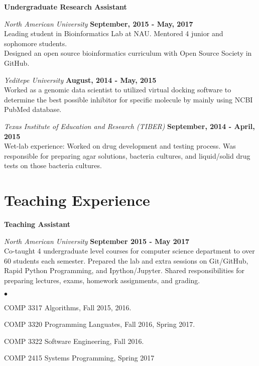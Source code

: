 \documentclass[margin,line]{res}
\newenvironment{list2}{
  \begin{list}{$\bullet$}{%
      \setlength{\itemsep}{0in}
      \setlength{\parsep}{0in} \setlength{\parskip}{0in}
      \setlength{\topsep}{0in} \setlength{\partopsep}{0in}
      \setlength{\leftmargin}{0.2in}}}{\end{list}}
\begin{document}
\begin{resume}
{\bf Undergraduate Research Assistant}

\vspace{-.3cm}
{\em North American University} \hfill {\bf September, 2015 - May, 2017}\\
Leading student in Bioinformatics Lab at NAU. Mentored 4 junior and sophomore students.\\
Designed an open source bioinformatics curriculum with Open Source Society in GitHub.

{\em Yeditepe University} \hfill {\bf August, 2014 - May, 2015}\\
Worked as a genomic data scientist to utilized virtual docking software to determine the best possible inhibitor for specific molecule by mainly using NCBI PubMed database.

{\em Texas Institute of Education and Research (TIBER)} \hfill {\bf September, 2014 - April, 2015}\\
Wet-lab experience: Worked on drug development and testing process. Was responsible for preparing agar solutions, bacteria cultures, and liquid/solid drug tests on those bacteria cultures.


\section{\sc Teaching Experience}
{\bf Teaching Assistant}

\vspace{-.3cm}
{\em North American University} \hfill {\bf September 2015 - May 2017}\\
Co-taught 4 undergraduate level courses for computer science department to over 60 students each semester. Prepared the lab and extra sessions on Git/GitHub, Rapid Python Programming, and Ipython/Jupyter. Shared responsibilities for preparing lectures, exams, homework assignments, and  grading.
\vspace*{.05in}
\begin{list2}
\item COMP 3317 Algorithms, Fall 2015, 2016.
\item COMP 3320 Programming Languates, Fall 2016, Spring 2017.
\item COMP 3322 Software Engineering, Fall 2016.
\item COMP 2415 Systems Programming, Spring 2017
\end{list2}



\end{resume}
\end{document}
